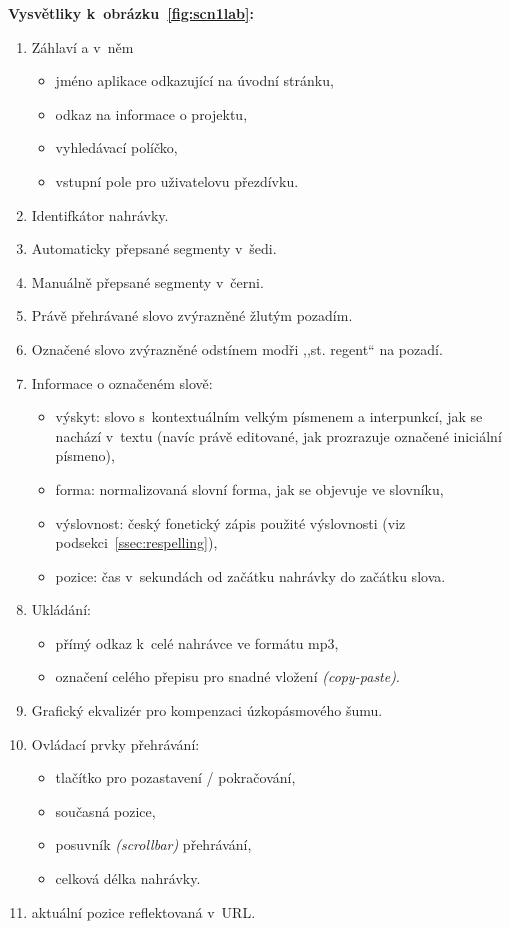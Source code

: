 \textbf{Vysvětliky k~obrázku~\ref{fig:scn1lab}:}
\begin{enumerate}
\item{
    Záhlaví a v~něm
    \begin{itemize}
    \item{jméno aplikace odkazující na úvodní stránku,}
    \item{odkaz na informace o projektu,}
    \item{vyhledávací políčko,}
    \item{vstupní pole pro uživatelovu přezdívku.}
    \end{itemize}
}
\item{Identifkátor nahrávky.}
\item{Automaticky přepsané segmenty v~šedi.}
\item{Manuálně přepsané segmenty v~černi.}
\item{Právě přehrávané slovo zvýrazněné žlutým pozadím.}
\item{Označené slovo zvýrazněné odstínem modři ,,st. regent`` na pozadí.}
\item{
    Informace o označeném slově:
    \begin{itemize}
    \item{
        výskyt: slovo s~kontextuálním velkým písmenem a
        interpunkcí, jak se nachází v~textu
        (navíc právě editované, jak prozrazuje označené iniciální písmeno),
    }
    \item{forma: normalizovaná slovní forma, jak se objevuje ve slovníku,}
    \item{
        výslovnost: český fonetický zápis použité výslovnosti (viz
        podsekci~\ref{ssec:respelling}),
    }
    \item{
        pozice: čas v~sekundách od začátku nahrávky do začátku slova.
    }
    \end{itemize}
}
\item{
    Ukládání:
    \begin{itemize}
    \item{přímý odkaz k~celé nahrávce ve formátu mp3,}
    \item{označení celého přepisu pro snadné vložení {\em (copy-paste)}.}
    \end{itemize}
}
\item{Grafický ekvalizér pro kompenzaci úzkopásmového šumu.}
\item{
    Ovládací prvky přehrávání:
    \begin{itemize}
    \item{tlačítko pro pozastavení / pokračování,}
    \item{současná pozice,}
    \item{posuvník {\em (scrollbar)} přehrávání,}
    \item{celková délka nahrávky.}
    \end{itemize}
}
\item{aktuální pozice reflektovaná v~URL.}
\end{enumerate}

